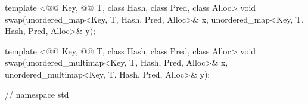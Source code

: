 \documentclass[american,twoside]{book}
\begin{document}
\begin{codeblock}
{  template <@@ Key, @@ T, class Hash, class Pred, class Alloc>
    void swap(unordered_map<Key, T, Hash, Pred, Alloc>& x,
              unordered_map<Key, T, Hash, Pred, Alloc>& y);

  template <@@ Key, @@ T, class Hash, class Pred, class Alloc>
    void swap(unordered_multimap<Key, T, Hash, Pred, Alloc>& x,
              unordered_multimap<Key, T, Hash, Pred, Alloc>& y);
} // namespace std
\end{codeblock}

%
%
%
%
\end{document}
